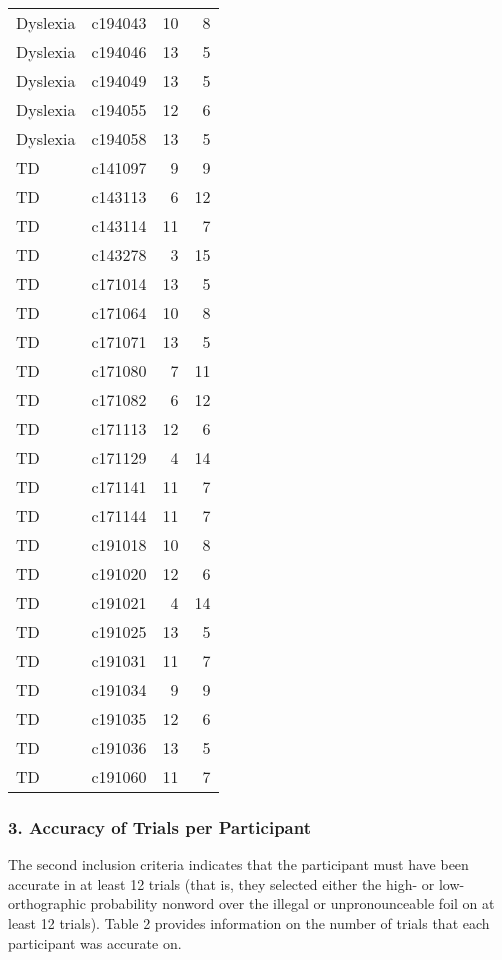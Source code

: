 \documentclass[
]{article}
\begin{document}
\begin{table}[t]
\begin{tabular*}{\linewidth}{@{\extracolsep{\fill}}llrr}
Dyslexia & c194043 & 10 & 8 \\ 
Dyslexia & c194046 & 13 & 5 \\ 
Dyslexia & c194049 & 13 & 5 \\ 
Dyslexia & c194055 & 12 & 6 \\ 
Dyslexia & c194058 & 13 & 5 \\ 
TD & c141097 & 9 & 9 \\ 
TD & c143113 & 6 & 12 \\ 
TD & c143114 & 11 & 7 \\ 
TD & c143278 & 3 & 15 \\ 
TD & c171014 & 13 & 5 \\ 
TD & c171064 & 10 & 8 \\ 
TD & c171071 & 13 & 5 \\ 
TD & c171080 & 7 & 11 \\ 
TD & c171082 & 6 & 12 \\ 
TD & c171113 & 12 & 6 \\ 
TD & c171129 & 4 & 14 \\ 
TD & c171141 & 11 & 7 \\ 
TD & c171144 & 11 & 7 \\ 
TD & c191018 & 10 & 8 \\ 
TD & c191020 & 12 & 6 \\ 
TD & c191021 & 4 & 14 \\ 
TD & c191025 & 13 & 5 \\ 
TD & c191031 & 11 & 7 \\ 
TD & c191034 & 9 & 9 \\ 
TD & c191035 & 12 & 6 \\ 
TD & c191036 & 13 & 5 \\ 
TD & c191060 & 11 & 7 \\ 
\bottomrule
\end{tabular*}
\end{table}

\subsubsection{3. Accuracy of Trials per
Participant}\label{accuracy-of-trials-per-participant}

The second inclusion criteria indicates that the participant must have
been accurate in at least 12 trials (that is, they selected either the
high- or low-orthographic probability nonword over the illegal or
unpronounceable foil on at least 12 trials). Table 2 provides
information on the number of trials that each participant was accurate
on.
\end{document}
